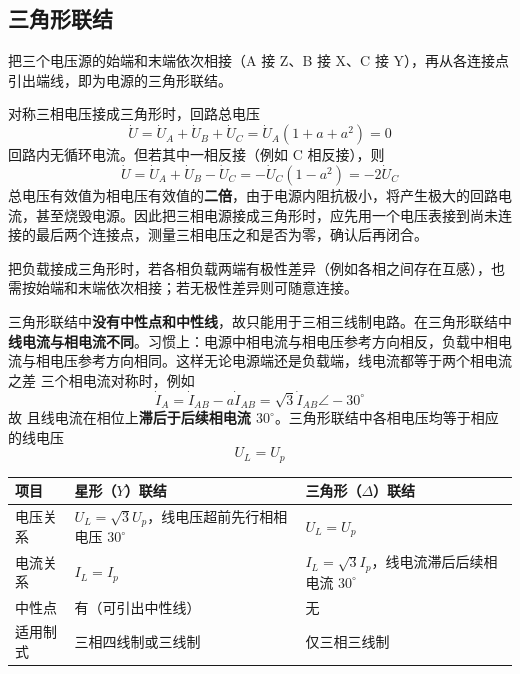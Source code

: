 \subsection{三角形联结}
把三个电压源的始端和末端依次相接（A 接 Z、B 接 X、C 接 Y），再从各连接点引出端线，即为电源的三角形联结。

对称三相电压接成三角形时，回路总电压
\begin{equation}
\dot{U}=\dot{U}_A+\dot{U}_B+\dot{U}_C=\dot{U}_A\left(1+a+a^2\right)=0
\end{equation}
回路内无循环电流。但若其中一相反接（例如 C 相反接），则
\begin{equation}
\dot{U}=\dot{U}_A+\dot{U}_B-\dot{U}_C=-\dot{U}_C\left(1-a^2\right)=-2\dot{U}_C
\end{equation}
总电压有效值为相电压有效值的\textbf{二倍}，由于电源内阻抗极小，将产生极大的回路电流，甚至烧毁电源。因此把三相电源接成三角形时，应先用一个电压表接到尚未连接的最后两个连接点，测量三相电压之和是否为零，确认后再闭合。

把负载接成三角形时，若各相负载两端有极性差异（例如各相之间存在互感），也需按始端和末端依次相接；若无极性差异则可随意连接。

三角形联结中\textbf{没有中性点和中性线}，故只能用于三相三线制电路。在三角形联结中\textbf{线电流与相电流不同}。习惯上：电源中相电流与相电压参考方向相反，负载中相电流与相电压参考方向相同。这样无论电源端还是负载端，线电流都等于两个相电流之差
三个相电流对称时，例如
\begin{equation}
\dot{I}_A=\dot{I}_{AB}-a\dot{I}_{AB}=\sqrt{3}\dot{I}_{AB}\angle-30^\circ
\end{equation}
故
且线电流在相位上\textbf{滞后于后续相电流 $30^\circ$}。三角形联结中各相电压均等于相应的线电压
\begin{equation}
U_L=U_p
\end{equation}

\begin{center}
\begin{tabular}{@{}lll@{}}
\toprule
项目 & 星形（$Y$）联结 & 三角形（$\Delta$）联结 \\
\midrule
电压关系 & $U_L=\sqrt{3}U_p$，线电压超前先行相相电压 $30^\circ$ & $U_L=U_p$ \\
电流关系 & $I_L=I_p$ & $I_L=\sqrt{3}I_p$，线电流滞后后续相电流 $30^\circ$ \\
中性点 & 有（可引出中性线） & 无 \\
适用制式 & 三相四线制或三线制 & 仅三相三线制 \\
\bottomrule
\end{tabular}
\end{center}

